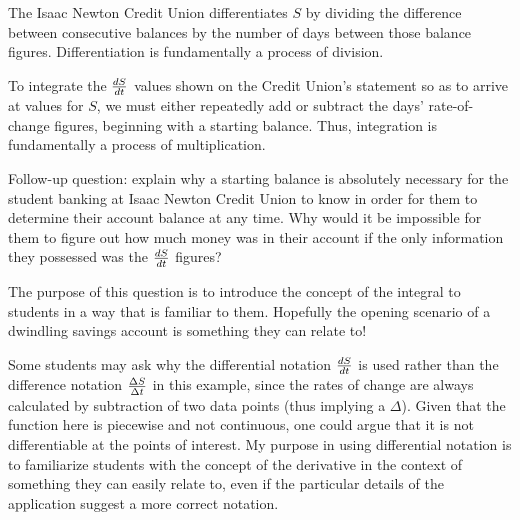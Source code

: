 
The Isaac Newton Credit Union differentiates $S$ by dividing the difference between consecutive balances by the number of days between those balance figures.  Differentiation is fundamentally a process of division.

To integrate the $dS\over dt$ values shown on the Credit Union's statement so as to arrive at values for $S$, we must either repeatedly add or subtract the days' rate-of-change figures, beginning with a starting balance.  Thus, integration is fundamentally a process of multiplication.

\vskip 10pt

Follow-up question: explain why a starting balance is absolutely necessary for the student banking at Isaac Newton Credit Union to know in order for them to determine their account balance at any time.  Why would it be impossible for them to figure out how much money was in their account if the only information they possessed was the $dS \over dt$ figures?







The purpose of this question is to introduce the concept of the integral to students in a way that is familiar to them.  Hopefully the opening scenario of a dwindling savings account is something they can relate to!

Some students may ask why the differential notation $dS \over dt$ is used rather than the difference notation $\Delta S \over \Delta t$ in this example, since the rates of change are always calculated by subtraction of two data points (thus implying a $\Delta$).  Given that the function here is piecewise and not continuous, one could argue that it is not differentiable at the points of interest.  My purpose in using differential notation is to familiarize students with the concept of the derivative in the context of something they can easily relate to, even if the particular details of the application suggest a more correct notation.




